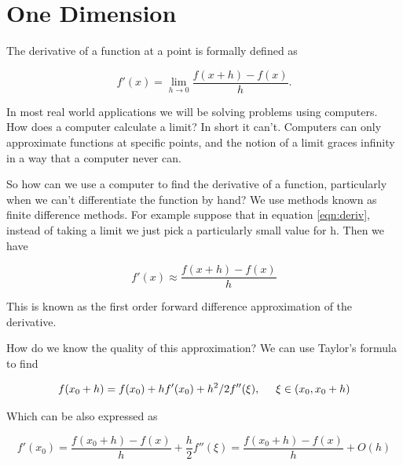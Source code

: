 \label{Ch:Numerical Derivatives}


\section*{One Dimension}

The derivative of a function at a point is formally defined as

\begin{equation}
\label{eqn:deriv}
f'(x) = \lim_{h\rightarrow 0} \frac{f(x + h)-f(x)}{h}.
\end{equation}

In most real world applications we will be solving problems using computers. How does a computer calculate a limit? In short it can't. Computers can only approximate functions at specific points, and the notion of a limit graces infinity in a way that a computer never can.

So how can we use a computer to find the derivative of a function, particularly when we can't differentiate the function by hand? We use methods known as finite difference methods. For example suppose that in equation \ref{eqn:deriv}, instead of taking a limit we just pick a particularly small value for h. Then we have

\begin{equation*}
f'(x) \approx \frac{f(x + h)-f(x)}{h}
\end{equation*}

This is known as the first order forward difference approximation of the derivative.

How do we know the quality of this approximation? We can use Taylor's formula to find

\begin{equation*}
f(x_0 + h) = f(x_0) + hf'(x_0) + h^2/2 f''(\xi),\hspace{5mm} \xi \in (x_0,x_0 + h)
\end{equation*}

Which can be also expressed as

\begin{equation*}
f'(x_0) = \frac{f(x_0 + h) - f(x)}{h} + \frac{h}{2}f''(\xi) = \frac{f(x_0 + h) - f(x)}{h} + O(h)
\end{equation*}

